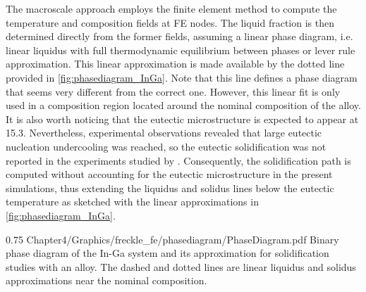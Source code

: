 The macroscale approach employs the finite element method to compute the temperature and composition fields at FE nodes. 
The liquid fraction is then determined directly from the former fields, assuming a linear phase diagram, i.e. linear liquidus 
with full thermodynamic equilibrium between phases or lever rule approximation. This linear approximation is made available by 
the dotted line provided in \cref{fig:phasediagram_InGa}. Note that this line defines a phase diagram that seems very different from the correct one. 
However, this linear fit is only used in a composition region located around the nominal composition of the alloy. It is also worth 
noticing that the eutectic microstructure is expected to appear at \SI{15.3}{\udegC}. Nevertheless, experimental observations revealed that large 
eutectic nucleation undercooling was reached, so the eutectic solidification was not reported in the experiments studied by 
\citet{shevchenko_chimney_2013}. Consequently, the solidification path is computed without accounting for the eutectic microstructure 
in the present simulations, thus extending the liquidus and solidus lines below the eutectic temperature as sketched with the linear 
approximations in \cref{fig:phasediagram_InGa}.

\begin{figureth}
{0.75}
{Chapter4/Graphics/freckle_fe/phasediagram/PhaseDiagram.pdf}
{Binary phase diagram of the In-Ga system \citep{andersson_thermo-calc_2002,tcbin_tcbin:_2006} and 
its approximation for solidification studies with an  alloy. 
The dashed and dotted lines are linear liquidus and solidus approximations near the nominal composition.}
\label{fig:phasediagram_InGa}
\end{figureth}


